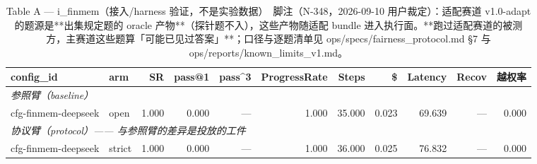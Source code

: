 \begin{table}[t]
\centering
\caption{Table A — i\_finmem（接入/harness 验证，不是实验数据）　脚注（N-348，2026-09-10 用户裁定）：适配赛道 v1.0-adapt 的题源是**出集规定题的 oracle 产物**（探针题不入），这些产物随适配 bundle 进入执行面。**跑过适配赛道的被测方，主赛道这些题算「可能已见过答案」**；口径与逐题清单见 ops/specs/fairness\_protocol.md §7 与 ops/reports/known\_limits\_v1.md。}
\label{tab:a-i_finmem}
\begin{tabular}{llrrrrrrrrr}
\toprule
config\_id & arm & SR & pass@1 & pass\^{}3 & ProgressRate & Steps & \$ & Latency & Recov & 越权率 \\
\midrule
\multicolumn{11}{l}{\textit{参照臂（baseline）}} \\
cfg-finmem-deepseek & open & 1.000 & 0.000 & --- & 1.000 & 35.000 & 0.023 & 69.639 & --- & 0.000 \\
\midrule
\multicolumn{11}{l}{\textit{协议臂（protocol）—— 与参照臂的差异是投放的工件}} \\
cfg-finmem-deepseek & strict & 1.000 & 0.000 & --- & 1.000 & 36.000 & 0.025 & 76.832 & --- & 0.000 \\
\bottomrule
\end{tabular}
\end{table}

